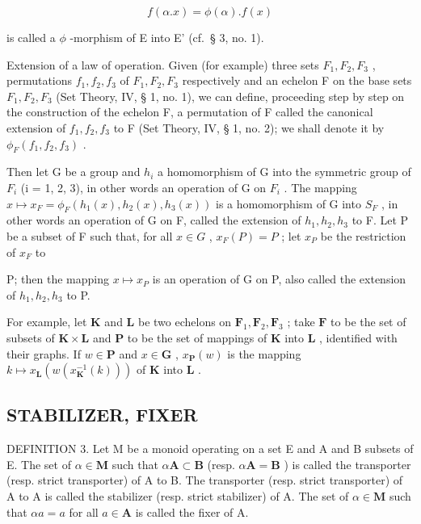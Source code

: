 \[
f (\alpha . x) = \phi (\alpha). f (x)
\]

is called a \(\phi\) -morphism of E into E' (cf.~§ 3, no. 1).

Extension of a law of operation. Given (for example) three sets \(F_{1}, F_{2}, F_{3}\) , permutations \(f_{1}, f_{2}, f_{3}\) of \(F_{1}, F_{2}, F_{3}\) respectively and an echelon F on the base sets \(F_{1}, F_{2}, F_{3}\) (Set Theory, IV, § 1, no. 1), we can define, proceeding step by step on the construction of the echelon F, a permutation of F called the canonical extension of \(f_{1}, f_{2}, f_{3}\) to F (Set Theory, IV, § 1, no. 2); we shall denote it by \(\phi_{F}(f_{1}, f_{2}, f_{3})\) .

Then let G be a group and \(h_{i}\) a homomorphism of G into the symmetric group of \(F_{i}\) (i = 1, 2, 3), in other words an operation of G on \(F_{i}\) . The mapping \(x \mapsto x_{F} = \phi_{F}(h_{1}(x), h_{2}(x), h_{3}(x))\) is a homomorphism of G into \(S_{F}\) , in other words an operation of G on F, called the extension of \(h_{1}, h_{2}, h_{3}\) to F. Let P be a subset of F such that, for all \(x \in G\) , \(x_{F}(P) = P\) ; let \(x_{P}\) be the restriction of \(x_{F}\) to

P; then the mapping \(x \mapsto x_{P}\) is an operation of G on P, also called the extension of \(h_{1}, h_{2}, h_{3}\) to P.

For example, let \(\mathbf{K}\) and \(\mathbf{L}\) be two echelons on \(\mathbf{F}_1, \mathbf{F}_2, \mathbf{F}_3\) ; take \(\mathbf{F}\) to be the set of subsets of \(\mathbf{K} \times \mathbf{L}\) and \(\mathbf{P}\) to be the set of mappings of \(\mathbf{K}\) into \(\mathbf{L}\) , identified with their graphs. If \(w \in \mathbf{P}\) and \(x \in \mathbf{G}\) , \(x_{\mathbf{P}}(w)\) is the mapping \(k \mapsto x_{\mathbf{L}}(w(x_{\mathbf{K}}^{-1}(k)))\) of \(\mathbf{K}\) into \(\mathbf{L}\) .

\subsection{STABILIZER, FIXER}

DEFINITION 3. Let M be a monoid operating on a set E and A and B subsets of E. The set of \(\alpha \in \mathbf{M}\) such that \(\alpha \mathbf{A} \subset \mathbf{B}\) (resp. \(\alpha \mathbf{A} = \mathbf{B}\) ) is called the transporter (resp. strict transporter) of A to B. The transporter (resp. strict transporter) of A to A is called the stabilizer (resp. strict stabilizer) of A. The set of \(\alpha \in \mathbf{M}\) such that \(\alpha a = a\) for all \(a \in \mathbf{A}\) is called the fixer of A.

